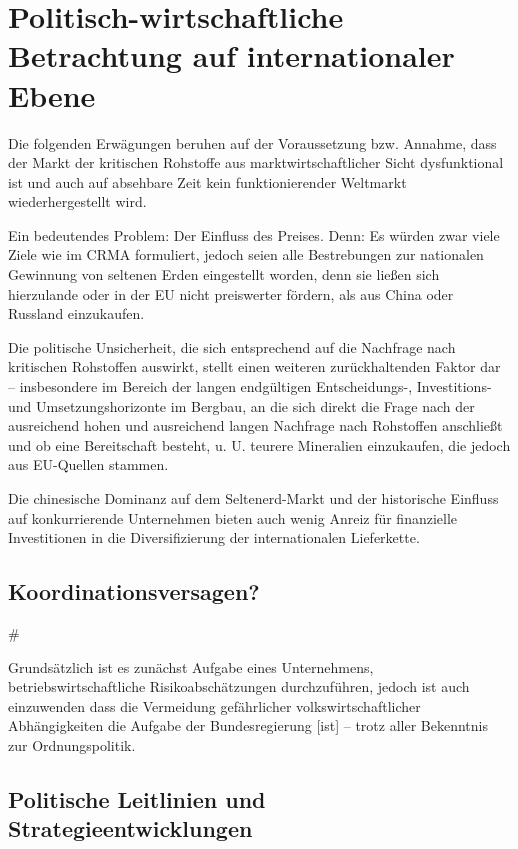 \documentclass[12pt,a4paper,oneside]{book} %
\begin{document}

\chapter{Politisch-wirtschaftliche Betrachtung auf internationaler Ebene}

Die folgenden Erwägungen beruhen auf der Voraussetzung bzw. Annahme, dass der Markt der kritischen Rohstoffe aus marktwirtschaftlicher Sicht dysfunktional ist und auch auf absehbare Zeit kein funktionierender Weltmarkt wiederhergestellt wird.

Ein bedeutendes Problem: Der Einfluss des Preises. Denn: Es würden zwar viele Ziele wie im CRMA formuliert, jedoch seien alle Bestrebungen zur nationalen Gewinnung von seltenen Erden eingestellt worden, denn sie ließen sich \glqq hierzulande oder in der EU nicht preiswerter fördern, als aus China oder Russland einzukaufen\grqq.\autocite{VDI Nachrichten: Seltene Erden: Deutschland importiert lieber, als selbst zu fördern}

Die politische Unsicherheit, die sich entsprechend auf die Nachfrage nach kritischen Rohstoffen auswirkt, stellt einen weiteren zurückhaltenden Faktor dar -- insbesondere im Bereich der langen endgültigen Entscheidungs-, Investitions- und Umsetzungshorizonte im Bergbau, an die sich direkt die Frage nach der ausreichend hohen und ausreichend langen Nachfrage nach Rohstoffen anschließt und ob eine Bereitschaft besteht, u. U. teurere Mineralien einzukaufen, die jedoch aus EU-Quellen stammen.

Die chinesische Dominanz auf dem Seltenerd-Markt und der historische Einfluss auf konkurrierende Unternehmen bieten auch wenig Anreiz für finanzielle Investitionen in die Diversifizierung der internationalen Lieferkette.

\section{Koordinationsversagen?}#

Grundsätzlich ist es zunächst Aufgabe eines Unternehmens, betriebswirtschaftliche Risikoabschätzungen durchzuführen, jedoch ist auch einzuwenden dass die \glqq Vermeidung gefährlicher volkswirtschaftlicher Abhängigkeiten die Aufgabe der Bundesregierung [ist] -- trotz aller Bekenntnis zur Ordnungspolitik\grqq.\autocite{Wirtschaft fordert mehr Tempo bei Rohstofffonds}

\section{Politische Leitlinien und Strategieentwicklungen}
\end{document}
